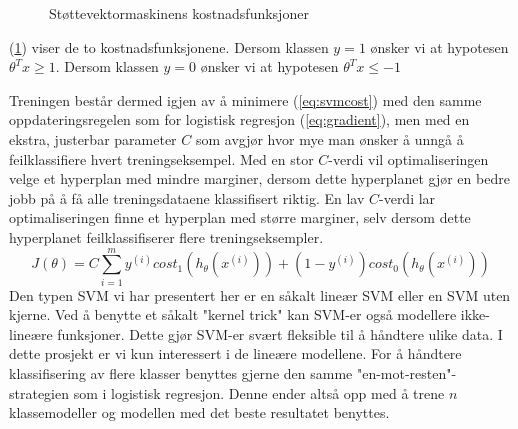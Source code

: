 \begin{figure}[h!]
\begin{subfigure}{0.5\textwidth}
\centering
{}
\end{subfigure}
\begin{subfigure}{0.5\textwidth}
\centering
{}
\end{subfigure}
\caption{Støttevektormaskinens kostnadsfunksjoner}
\label{figure:svmcost}
\end{figure}
(\ref{figure:svmcost}) viser de to kostnadsfunksjonene. Dersom klassen $y=1$ ønsker vi at hypotesen $\theta^{T}x \geq 1$. Dersom klassen $y=0$ ønsker vi at hypotesen $\theta^{T}x \leq -1$

Treningen består dermed igjen av å minimere (\ref{eq:svmcost}) med den samme oppdateringsregelen som for logistisk regresjon (\ref{eq:gradient}), men med en ekstra, justerbar parameter $C$ som avgjør hvor mye man ønsker å unngå å feilklassifiere hvert treningseksempel. Med en stor $C$-verdi vil optimaliseringen velge et hyperplan med mindre marginer, dersom dette hyperplanet gjør en bedre jobb på å få alle treningsdataene klassifisert riktig. En lav $C$-verdi lar optimaliseringen finne et hyperplan med større marginer, selv dersom dette hyperplanet feilklassifiserer flere treningseksempler.
\begin{equation}
J(\theta) = 
    C \sum_{i=1}^{m} y^{(i)}cost_1(h_\theta(x^{(i)})) + (1-y^{(i)})cost_0(h_\theta(x^{(i)}))
\label{eq:svmcost}
\end{equation}
Den typen SVM vi har presentert her er en såkalt lineær SVM eller en SVM uten kjerne. Ved å benytte et såkalt "kernel trick" kan SVM-er også modellere ikke-lineære funksjoner. Dette gjør SVM-er svært fleksible til å håndtere ulike data. I dette prosjekt er vi kun interessert i de lineære modellene. For å håndtere klassifisering av flere klasser benyttes gjerne den samme "en-mot-resten"-strategien som i logistisk regresjon. Denne ender altså opp med å trene $n$ klassemodeller og modellen med det beste resultatet benyttes.\\

